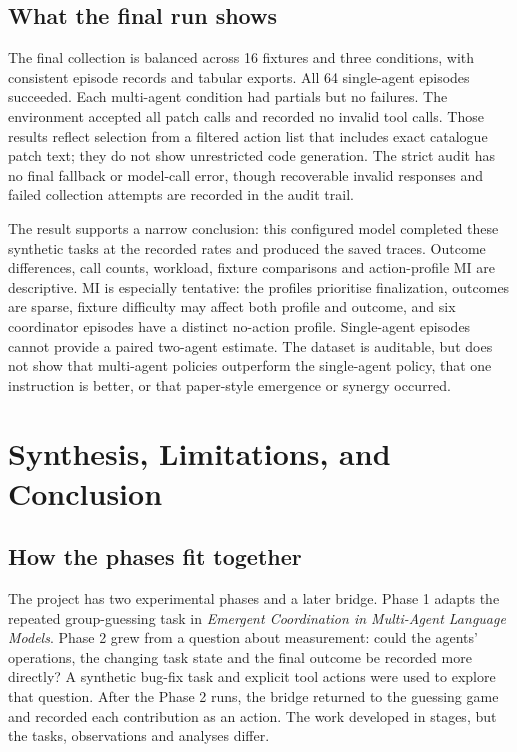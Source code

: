 \documentclass[12pt,a4paper,oneside]{report}
\begin{document}
\section{What the final run shows}
The final collection is balanced across 16 fixtures and three conditions, with consistent episode records and tabular exports. All 64 single-agent episodes succeeded. Each multi-agent condition had partials but no failures. The environment accepted all patch calls and recorded no invalid tool calls. Those results reflect selection from a filtered action list that includes exact catalogue patch text; they do not show unrestricted code generation. The strict audit has no final fallback or model-call error, though recoverable invalid responses and failed collection attempts are recorded in the audit trail.

The result supports a narrow conclusion: this configured model completed these synthetic tasks at the recorded rates and produced the saved traces. Outcome differences, call counts, workload, fixture comparisons and action-profile MI are descriptive. MI is especially tentative: the profiles prioritise finalization, outcomes are sparse, fixture difficulty may affect both profile and outcome, and six coordinator episodes have a distinct no-action profile. Single-agent episodes cannot provide a paired two-agent estimate. The dataset is auditable, but does not show that multi-agent policies outperform the single-agent policy, that one instruction is better, or that paper-style emergence or synergy occurred.

\chapter{Synthesis, Limitations, and Conclusion}
\label{chapter-10}
\thispagestyle{plain}
\section{How the phases fit together}
The project has two experimental phases and a later bridge. Phase 1 adapts the repeated group-guessing task in \emph{Emergent Coordination in Multi-Agent Language Models}. Phase 2 grew from a question about measurement: could the agents’ operations, the changing task state and the final outcome be recorded more directly? A synthetic bug-fix task and explicit tool actions were used to explore that question. After the Phase 2 runs, the bridge returned to the guessing game and recorded each contribution as an action. The work developed in stages, but the tasks, observations and analyses differ.
\end{document}
